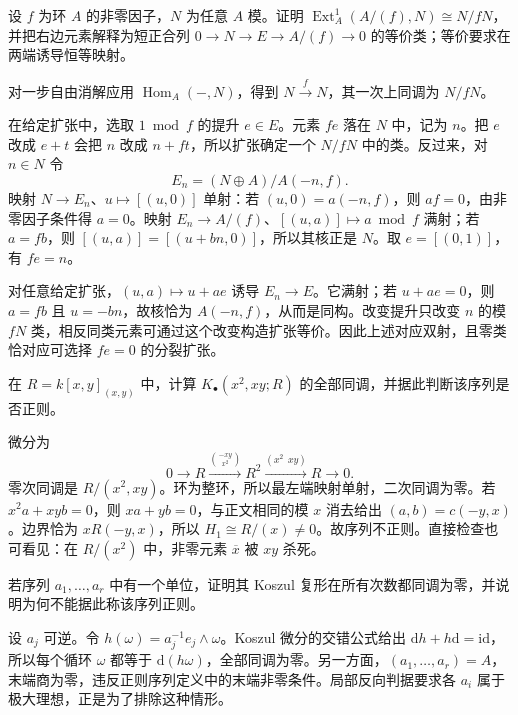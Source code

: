 \begin{exercise}\label{g5:ex:ext-extension-principal}
	设 \(f\) 为环 \(A\) 的非零因子，\(N\) 为任意 \(A\) 模。证明
	\(\operatorname{Ext}_A^1(A/(f),N)\cong N/fN\)，并把右边元素解释为短正合列
	\(0\to N\to E\to A/(f)\to0\) 的等价类；等价要求在两端诱导恒等映射。
\end{exercise}
\begin{solution}
	对一步自由消解应用 \(\operatorname{Hom}_A(-,N)\)，得到 \(N\xrightarrow{f}N\)，其一次上同调为 \(N/fN\)。

	在给定扩张中，选取 \(1\bmod f\) 的提升 \(e\in E\)。元素 \(fe\) 落在 \(N\) 中，记为 \(n\)。把 \(e\) 改成 \(e+t\) 会把 \(n\) 改成 \(n+ft\)，所以扩张确定一个 \(N/fN\) 中的类。反过来，对 \(n\in N\) 令
	\[
		E_n=(N\oplus A)/A(-n,f).
	\]
	映射 \(N\to E_n\)、\(u\mapsto[(u,0)]\) 单射：若 \((u,0)=a(-n,f)\)，则 \(af=0\)，由非零因子条件得 \(a=0\)。映射 \(E_n\to A/(f)\)、\([(u,a)]\mapsto a\bmod f\) 满射；若 \(a=fb\)，则 \([(u,a)]=[(u+bn,0)]\)，所以其核正是 \(N\)。取 \(e=[(0,1)]\)，有 \(fe=n\)。

	对任意给定扩张，\((u,a)\mapsto u+ae\) 诱导 \(E_n\to E\)。它满射；若 \(u+ae=0\)，则 \(a=fb\) 且 \(u=-bn\)，故核恰为 \(A(-n,f)\)，从而是同构。改变提升只改变 \(n\) 的模 \(fN\) 类，相反同类元素可通过这个改变构造扩张等价。因此上述对应双射，且零类恰对应可选择 \(fe=0\) 的分裂扩张。
\end{solution}

\begin{exercise}\label{g5:ex:koszul-embedded-homology}
	在 \(R=k[x,y]_{(x,y)}\) 中，计算 \(K_\bullet(x^2,xy;R)\) 的全部同调，并据此判断该序列是否正则。
\end{exercise}
\begin{solution}
	微分为
	\[
		0\longrightarrow R\xrightarrow{\binom{-xy}{x^2}}R^2
		\xrightarrow{(x^2\ \ xy)}R\longrightarrow0.
	\]
	零次同调是 \(R/(x^2,xy)\)。环为整环，所以最左端映射单射，二次同调为零。若 \(x^2a+xyb=0\)，则 \(xa+yb=0\)，与正文相同的模 \(x\) 消去给出 \((a,b)=c(-y,x)\)。边界恰为 \(xR(-y,x)\)，所以
	\(H_1\cong R/(x)\ne0\)。故序列不正则。直接检查也可看见：在 \(R/(x^2)\) 中，非零元素 \(\overline x\) 被 \(xy\) 杀死。
\end{solution}

\begin{exercise}\label{g5:ex:koszul-unit-contraction}
	若序列 \(a_1,\ldots,a_r\) 中有一个单位，证明其 Koszul 复形在所有次数都同调为零，并说明为何不能据此称该序列正则。
\end{exercise}
\begin{solution}
	设 \(a_j\) 可逆。令 \(h(\omega)=a_j^{-1}e_j\wedge\omega\)。Koszul 微分的交错公式给出
	\(\mathrm dh+h\mathrm d=\mathrm{id}\)，所以每个循环 \(\omega\) 都等于 \(\mathrm d(h\omega)\)，全部同调为零。另一方面，\((a_1,\ldots,a_r)=A\)，末端商为零，违反正则序列定义中的末端非零条件。局部反向判据要求各 \(a_i\) 属于极大理想，正是为了排除这种情形。
\end{solution}

